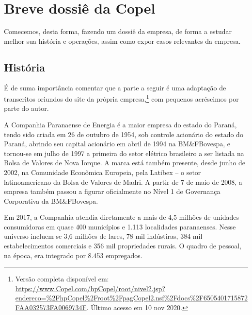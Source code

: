 \documentclass[grad,numbers]{coppe}
\begin{document}
  \hypertarget{breve-dossiuxea-da-copel}{%
  \section{Breve dossiê da Copel}\label{breve-dossiuxea-da-copel}}

  Comecemos, desta forma, fazendo um dossiê da empresa, de forma a estudar melhor sua história e operações, assim como expor casos relevantes da empresa.

  \hypertarget{histuxf3ria}{%
  \subsection{História}\label{histuxf3ria}}

  É de suma importância comentar que a parte a seguir é uma adaptação de transcritos oriundos do site da própria empresa,\footnote{Versão completa disponível em: \url{https://www.Copel.com/hpCopel/root/nivel2.jsp?endereco=\%2FhpCopel\%2Froot\%2FpagCopel2.nsf\%2Fdocs\%2F6505401715872FAA032573FA0069734F}. Último acesso em 10 nov 2020.} com pequenos acréscimos por parte do autor.

  A Companhia Paranaense de Energia é a maior empresa do estado do Paraná, tendo sido criada em 26 de outubro de 1954, sob controle acionário do estado do Paraná, abrindo seu capital acionário em abril de 1994 na BM\&FBovespa, e tornou-se em julho de 1997 a primeira do setor elétrico brasileiro a ser listada na Bolsa de Valores de Nova Iorque. A marca está também presente, desde junho de 2002, na Comunidade Econômica Europeia, pela Latibex -- o setor latinoamericano da Bolsa de Valores de Madri. A partir de 7 de maio de 2008, a empresa também passou a figurar oficialmente no Nível 1 de Governança Corporativa da BM\&FBovespa.

  Em 2017, a Companhia atendia diretamente a mais de 4,5 milhões de unidades consumidoras em quase 400 municípios e 1.113 localidades paranaenses. Nesse universo incluem-se 3,6 milhões de lares, 78 mil indústiras, 384 mil estabelecimentos comerciais e 356 mil propriedades rurais. O quadro de pessoal, na época, era integrado por 8.453 empregados.
\end{document}
